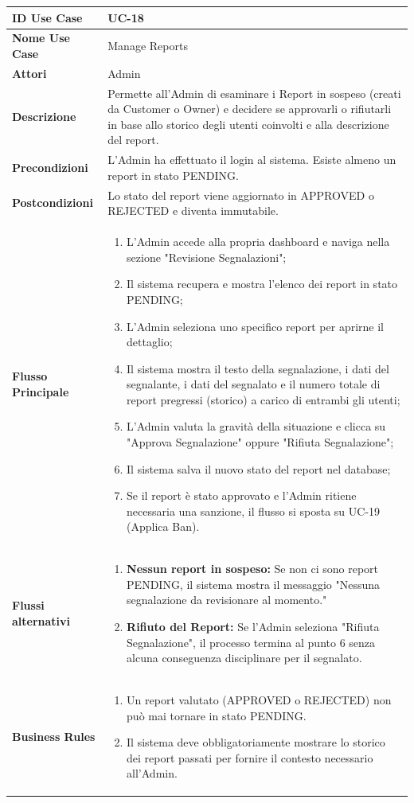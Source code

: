 \documentclass{article}
\newcommand{\usecasetable}[9]{
	\begin{table}[h!]
		\centering
		\footnotesize
		\renewcommand{\arraystretch}{1.4}
		\begin{tabularx}{\textwidth}{|l|>{\raggedright\arraybackslash}X|}
			\hline
			\textbf{ID Use Case} & #1 \\ \hline
			\textbf{Nome Use Case} & #2 \\ \hline
			\textbf{Attori} & #3 \\ \hline
			\textbf{Descrizione} & #4 \\ \hline
			\textbf{Precondizioni} & #5 \\ \hline
			\textbf{Postcondizioni} & #6 \\ \hline
			\textbf{Flusso Principale} & #7 \\ \hline
			\textbf{Flussi alternativi} & #8 \\ \hline
			\textbf{Business Rules} & #9 \\ \hline
		\end{tabularx}
	\end{table}
}
\begin{document}
	\usecasetable
	{UC-18}
	{Manage Reports}
	{Admin}
	{Permette all'Admin di esaminare i Report in sospeso (creati da Customer o Owner) e decidere se approvarli o rifiutarli in base allo storico degli utenti coinvolti e alla descrizione del report.}
	{L'Admin ha effettuato il login al sistema. Esiste almeno un report in stato PENDING.}
	{Lo stato del report viene aggiornato in APPROVED o REJECTED e diventa immutabile.}
	{
		\begin{enumerate}[nosep, leftmargin=*]
			\item L'Admin accede alla propria dashboard e naviga nella sezione "Revisione Segnalazioni";
			\item Il sistema recupera e mostra l'elenco dei report in stato PENDING;
			\item L'Admin seleziona uno specifico report per aprirne il dettaglio;
			\item Il sistema mostra il testo della segnalazione, i dati del segnalante, i dati del segnalato e il numero totale di report pregressi (storico) a carico di entrambi gli utenti;
			\item L'Admin valuta la gravità della situazione e clicca su "Approva Segnalazione" oppure "Rifiuta Segnalazione";
			\item Il sistema salva il nuovo stato del report nel database;
			\item Se il report è stato approvato e l'Admin ritiene necessaria una sanzione, il flusso si sposta su UC-19 (Applica Ban).
		\end{enumerate}
	}
	{
		\begin{enumerate}[nosep, leftmargin=25px]
			\item[\textbf{2a.}] \textbf{Nessun report in sospeso:} Se non ci sono report PENDING, il sistema mostra il messaggio "Nessuna segnalazione da revisionare al momento."
			\item[\textbf{5a.}] \textbf{Rifiuto del Report:} Se l'Admin seleziona "Rifiuta Segnalazione", il processo termina al punto 6 senza alcuna conseguenza disciplinare per il segnalato.
		\end{enumerate}
	}
	{
		\begin{enumerate}[nosep, leftmargin=*]
			\item[•] Un report valutato (APPROVED o REJECTED) non può mai tornare in stato PENDING.
			\item[•] Il sistema deve obbligatoriamente mostrare lo storico dei report passati per fornire il contesto necessario all'Admin.
		\end{enumerate}
	}
		
\end{document}
